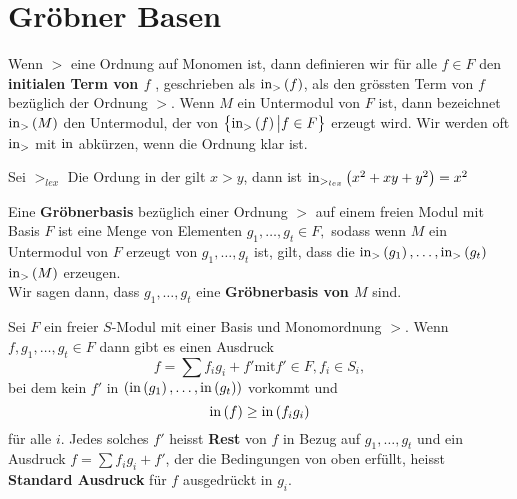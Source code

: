 \documentclass{article}
\begin{document}
\section{Gr\"obner Basen}
	\begin{defn}
		Wenn 
		\( > \)
		eine Ordnung auf Monomen ist,
		dann definieren wir f\"ur alle 
		\( f \in F \)
		den \textbf{initialen Term von \( f\) },
		geschrieben als 
		\( \operatorname{in}_{>} \left( f \right) \),
		als den gr\"ossten Term von 
		\( f \) 
		bez\"uglich der Ordnung
		\( > \).
		Wenn 
		\( M \) 
		ein Untermodul von 
		\( F \) 
		ist,
		dann bezeichnet 
		\( \operatorname{in}_{>} \left( M \right) \)
		den Untermodul, 
		der von 
		\( \left\{ \operatorname{in}_{>} \left( f \right) \big| f \in F \right\}\)
		erzeugt wird.
		Wir werden oft 
		\( \operatorname{in}_{>} \)
		mit 
		\( \operatorname{in} \)
		abk\"urzen,
		wenn die Ordnung klar ist.
	\end{defn}
	\begin{bsp}
		Sei 
		\( >_{lex} \) 
		Die Ordung in der gilt
		\( x > y \),
		dann ist 
		\( \operatorname{in}_{>_{lex}} \left( x^{2}+xy +y^{2} \right)=x^{2} \)

	\end{bsp}
	\begin{defn}
		Eine \textbf{Gr\"obnerbasis} bez\"uglich einer Ordnung 
		\( > \)
		auf einem freien Modul mit Basis
		\(F \)
		ist eine Menge von Elementen
		\( g_{1},\dots,g_{t} \in F,\)
		sodass wenn 
		\( M \) 
		ein Untermodul von 
		\( F \) 
		erzeugt von
		\( g_{1}, \dots , g_{t} \)
		ist,
		gilt, dass die
		\( \operatorname{in}_{>}  \left(  g_{1} \right),
		\dots,
		\operatorname{in}_{>} \left( g_{t} \right) \)
		\( \operatorname{in}_{>} \left( M \right) \)
		erzeugen. \\
		Wir sagen dann,
		dass
		\( g_{1},\dots,g_{t} \)
		eine
		\textbf{Gr\"obnerbasis von \( M \)}
		sind.


	\end{defn}
	\begin{propdef}
		Sei
		\( F \) 
		ein freier 
		\( S \)-Modul
		mit einer Basis und {Monomordnung 
		\(>\).} 
		Wenn 
		\( f,g_1,\dots,g_t \in F \) 
		dann gibt es einen Ausdruck 
		\[
			f= \sum f_i g_i +f' \text{mit} f' \in F, f_i \in S_i ,
		\]
		bei dem kein 
		\( f' \)
		in
		\( \left( \operatorname{in}\left(g_1\right),\dots,\operatorname{in}\left(g_t\right) \right) \) 
		vorkommt und 
		\[
			\operatorname{in}\left( f \right) \ge \operatorname{in}\left( f_i g_i  \right)
		\]
		f\"ur alle 
		\( i \).
		Jedes solches 
		\( f' \)
		heisst \textbf{Rest} von 
		\( f \) 
		in Bezug auf 
		\( g_{1},\dots,g_{t} \)
		und ein Ausdruck 
		\( f=\sum f_{i} g_{i} + f' \),
		der die Bedingungen von oben erf\"ullt,
		heisst
		\textbf{Standard Ausdruck} f\"ur 
		\(f\) 
		ausgedr\"uckt in
		\( g_{i} \).
	\end{propdef}
\end{document}
